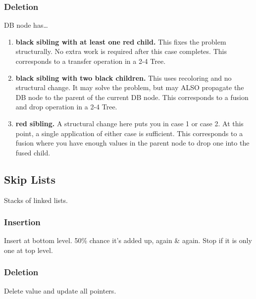 \begin{enumerate}
{%
        }
\end{enumerate}

\subsubsection*{Deletion}

DB node has\ldots
\begin{enumerate}%
    \item {\bfseries\color{black}black sibling with at least one red child.}
        This fixes the problem structurally. No extra work is required
        after this case completes. This corresponds to a transfer operation in a 2-4 Tree.
    \item {\bfseries\color{black}black sibling with two black children.}
        This uses recoloring and no structural change. It may solve the problem, but
        may ALSO propagate the DB node to the parent of the current DB node. This corresponds
        to a fusion and drop operation in a 2-4 Tree.
    \item {\bfseries\color{black}red sibling.}
        A structural change here puts you in case 1 or case 2.
        At this point, a single application of either case is sufficient.
        This corresponds to a fusion where you have enough values in the parent node to drop
        one into the fused child.
\end{enumerate}

\subsection*{Skip Lists}
Stacks of linked lists.
\subsubsection*{Insertion}
Insert at bottom level. 50\% chance it's added up, again \& again. Stop if it is only one at top level.
\subsubsection*{Deletion}
Delete value and update all pointers.
